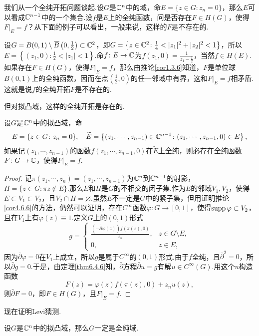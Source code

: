 我们从一个全纯开拓问题谈起.设$G$是$\mathbb C^n$中的域，命$E=\{z\in G\colon z_n=0\}$，那么$E$可以看成$\mathbb C^{n-1}$中的一个集合.设$f$是$E$上的全纯函数，问是否存在$F\in H(G)$，使得$F|_E=f$？从下面的例子可以看出，一般来说，这样的$F$是不存在的.
\begin{example}\label{exa6.5.1}
	设$G=B(0,1)\setminus {}\mkern1mu\overline{\mkern-1muB}\left(0,\frac12\right)\subset\mathbb C^2$，即$G=\left\{z\in\MC^2\colon\frac14<|z_1|^2+|z_2|^2<1\right\}$，所以$E=\left\{(z_1,0)\colon\frac12<|z_1|<1\right\}$.命$f\colon E\to\mathbb C$为$f(z_1,0)=\frac1{z_1-\frac12}$，当然$f\in H(E)$.如果存在$F\in H(G)$，使得$F|_E=f$，那么由推论\ref{cor1.3.6}知道，$F$是单位球$B(0,1)$上的全纯函数，因而在点$\left(\frac12,0\right)$的任一邻域中有界，这和$F|_E=f$相矛盾.这就是说$f$的全纯开拓$F$是不存在的.
\end{example}
但对拟凸域，这样的全纯开拓是存在的.
\begin{lemma}\label{lem6.5.2}
	设$G$是$\mathbb C^n$中的拟凸域，命
	\[E=\{z\in G\colon z_n=0\},\quad \widetilde{E}=\left\{(z_1,\cdots,z_{n-1})\in \mathbb C^{n-1}\colon(z_1,\cdots,z_{n-1},0)\in E\right\},\]
	如果记$(z_1,\cdots,z_{n-1})$的函数$f(z_1,\cdots,z_{n-1},0)$在$\widetilde{E}$上全纯，则必存在全纯函数$F\colon G\to\mathbb C$，使得$F|_E=f$.
\end{lemma}
\begin{proof}
	记$\pi(z_1,\cdots,z_n)=(z_1,\cdots,z_{n-1})$为$\mathbb C^n$到$\mathbb C^{n-1}$的射影，$H=\{z\in G\colon \pi z\notin\widetilde{E}\}$.那么$E$和$H$是$G$的不相交的闭子集.作为$E$的邻域$V_1,V_2$，使得$E\subset V_1\subset V_2$，且$V_2\cap H=\varnothing$.虽然$E$不一定是$G$中的紧子集，但用证明推论\ref{cor4.6.6}的方法，仍然可以证明，存在$C^\infty$函数$\varphi\colon G\to[0,1]$，使得$\operatorname{supp}\varphi\subset V_2$，且在$V_1$上有$\varphi(z)\equiv1$.定义$G$上的$(0,1)$形式
	\begin{equation}\label{eq6.5.1}
		g=\begin{cases}
			\frac{(-\bar{\partial}\varphi(z))f(\pi(z),0)}{z_n},&z\in G\setminus E,\\
			0,&z\in E,
		\end{cases}
	\end{equation}
	因为$\bar{\partial}\varphi=0$在$V_1$上成立，所以$g$是属于$C^\infty$的$(0,1)$形式.由于$f$全纯，且$\bar{\partial}^2=0$，所以$\bar{\partial}g=0$.于是，由定理\ref{thm6.4.6}知，$\bar{\partial}$方程$\bar{\partial}u=g$有解$u\in C^\infty(G)$.用这个$u$构造函数
	\[F(z)=\varphi(z)f(\pi(z),0)+z_n u(z),\]
	则$\bar{\partial}F=0$，即$F\in H(G)$，且$F|_E=f$.
\end{proof}
现在证明Levi猜测.
\begin{theorem}\label{thm6.5.3}
	设$G$是$\mathbb C^n$中的拟凸域，那么$G$一定是全纯域.
\end{theorem}
